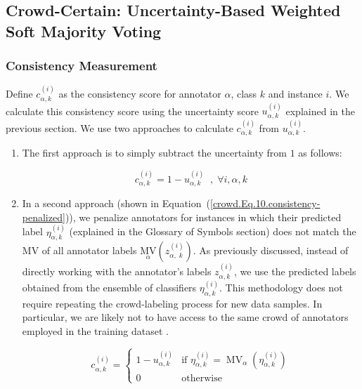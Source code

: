 \documentclass[pdflatex,bst/sn-basic]{bst/sn-jnl}%
\begin{document}
\subsection{Crowd-Certain: Uncertainty-Based Weighted Soft Majority Voting}

\subsubsection{Consistency Measurement}

Define $c_{\alpha,k}^{(i)} $ as the consistency score for annotator $\alpha $, class $k $ and instance $i $. We calculate this consistency score using the uncertainty score $u_{\alpha,k}^{(i)} $ explained in the previous section. We use two approaches to calculate $c_{\alpha,k}^{(i)} $ from $u_{\alpha,k}^{(i)} $.

\begin{enumerate}[1.]
    \item The first approach is to simply subtract the uncertainty from $1 $ as follows:

    \begin{equation}
        c_{\alpha,k}^{(i)}=1-u_{\alpha,k}^{(i)}\;\;,\;\forall i,\alpha,k
        \label{crowd.Eq.9.consistency}
    \end{equation}

    \item In a second approach (shown in Equation~(\ref{crowd.Eq.10.consistency-penalized})), we penalize annotators for instances in which their predicted label $\eta_{\alpha,k}^{(i)} $ (explained in the Glossary of Symbols section) does not match the MV of all annotator labels ${{\underset \alpha{\mathrm{MV}}}{\left(z_{\alpha,\;k}^{(i)}\right)}} $. As previously discussed, instead of directly working with the annotator's labels $z_{\alpha,k}^{(i)} $, we use the predicted labels obtained from the ensemble of classifiers $\eta_{\alpha,k}^{(i)} $. This methodology does not require repeating the crowd-labeling process for new data samples. In particular, we are likely not to have access to the same crowd of annotators employed in the training dataset .

    \begin{equation}
        c_{\alpha,k}^{(i)} =
        \begin{cases}
            1 - u_{\alpha,k}^{(i)} & \text{if } \eta_{\alpha,k}^{(i)} = \operatorname{MV}_{\alpha}(\eta_{\alpha,k}^{(i)}) \\
            0 & \text{otherwise}
        \end{cases}
        \label{crowd.Eq.10.consistency-penalized}
    \end{equation}

\end{enumerate}
\end{document}
